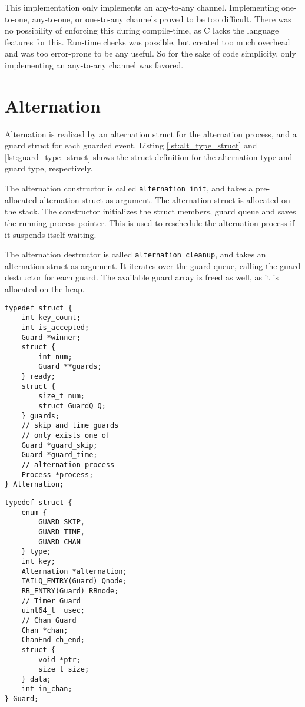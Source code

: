 This implementation only implements an any\hyp{}to\hyp{}any channel. Implementing one\hyp{}to\hyp{}one, any\hyp{}to\hyp{}one, or one\hyp{}to\hyp{}any channels proved to be too difficult. There was no possibility of enforcing this during compile\hyp{}time, as C lacks the language features for this. Run\hyp{}time checks was possible, but created too much overhead and was too error\hyp{}prone to be any useful. So for the sake of code simplicity, only implementing an any\hyp{}to\hyp{}any channel was favored. 

\section{Alternation}

Alternation is realized by an alternation struct for the alternation process, and a guard struct for each guarded event. Listing \ref{lst:alt_type_struct} and \ref{lst:guard_type_struct} shows the struct definition for the alternation type and guard type, respectively. 

The alternation constructor is called \texttt{alternation\_init}, and takes a pre\hyp{}allocated alternation struct as argument. The alternation struct is allocated on the stack. The constructor initializes the struct members, guard queue and saves the running process pointer. This is used to reschedule the alternation process if it suspends itself waiting. 

The alternation destructor is called \texttt{alternation\_cleanup}, and takes an alternation struct as argument. It iterates over the guard queue, calling the guard destructor for each guard. The available guard array is freed as well, as it is allocated on the heap. 

\noindent\begin{minipage}{.45\textwidth}
\begin{lstlisting}[caption={Alternation type struct},style={CustomC},label={lst:alt_type_struct}]
typedef struct {
    int key_count;
    int is_accepted;
    Guard *winner;
    struct {
        int num;
        Guard **guards;
    } ready;
    struct {
        size_t num;
        struct GuardQ Q;
    } guards;
    // skip and time guards 
    // only exists one of
    Guard *guard_skip; 
    Guard *guard_time;
    // alternation process
    Process *process;
} Alternation;
\end{lstlisting}
\end{minipage}\hfill
\begin{minipage}{.45\textwidth}
\begin{lstlisting}[caption={Guard type struct},style={CustomC},label={lst:guard_type_struct}]
typedef struct {
    enum {
        GUARD_SKIP,
        GUARD_TIME,
        GUARD_CHAN
    } type;
    int key;
    Alternation *alternation;
    TAILQ_ENTRY(Guard) Qnode;
    RB_ENTRY(Guard) RBnode;
    // Timer Guard
    uint64_t  usec;
    // Chan Guard
    Chan *chan;
    ChanEnd ch_end;
    struct {
        void *ptr;
        size_t size;
    } data;
    int in_chan;
} Guard;
\end{lstlisting}
\end{minipage}

